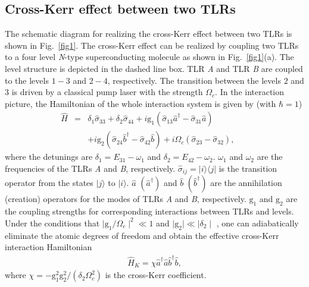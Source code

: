 \documentclass[showpacs,aps,graphicx,twocolumn]{revtex4}
\begin{document}
\subsection{Cross-Kerr effect between two TLRs}
\label{sec21}


The schematic diagram for realizing the cross-Kerr effect between
two TLRs is shown in Fig.~\ref{fig1}. The cross-Kerr effect can be
realized by coupling two TLRs to a four level \emph{N}-type
superconducting molecule as shown in Fig.~\ref{fig1}(a). The level
structure is depicted in the dashed line box. TLR \emph{A} and TLR
\emph{B} are coupled to the levels $1-3$ and $2-4$, respectively.
The transition between the levels $2$ and $3$ is driven by a
classical pump laser with the strength $\Omega_{c}$. In the interaction picture, the Hamiltonian
of the whole interaction system is given by \cite{YHu} (with
$\hbar=1$)
\begin{eqnarray}        \label{eq1}
\hat{H}&=&\delta_{1}\hat{\sigma}_{33}+\delta_{2}\hat{\sigma}_{44}
+i\text{g}_{1}\left(\hat{\sigma}_{13}\hat{a}^{\dag}-\hat{\sigma}_{31}\hat{a}\right)\nonumber\\
&&+i\text{g}_{2}\left(\hat{\sigma}_{24}\hat{b}^{\dag}-\hat{\sigma}_{42}\hat{b}\right)
+i\Omega_{c}\left(\hat{\sigma}_{23}-\hat{\sigma}_{32}\right),\;\;\;\;\;\;
\end{eqnarray}
where the detunings are $\delta_{1}=E_{31}-\omega_{1}$ and
$\delta_{2}=E_{42}-\omega_{2}$. $\omega_{1}$ and $\omega_{2}$ are
the frequencies of the TLRs \emph{A} and \emph{B}, respectively.
$\hat{\sigma}_{ij}=|i\rangle\langle j|$ is the transition operator
from the states $|j\rangle$ to $|i\rangle$. $\hat{a}$
$(\hat{a}^{\dag})$ and $\hat{b}$ $(\hat{b}^{\dag})$ are the
annihilation (creation) operators for the modes of TLRs \emph{A} and \emph{B}, respectively. $\text{g}_{1}$ and $\text{g}_{2}$ are the
coupling strengths for corresponding interactions between TLRs and
levels. Under the conditions that
$\mid\text{g}_{1}/\Omega_{c}\mid^{2}\ll 1$ and
$\mid\text{g}_{2}\mid\ll \mid\delta_{2}\mid$ \cite{AImamoglu1997},
one can adiabatically eliminate the atomic degrees of freedom and
obtain the effective cross-Kerr interaction Hamiltonian \cite{YHu}
\begin{eqnarray}        \label{eq2}
\hat{H}_{K}=\chi\hat{a}^{\dag}\hat{a}\hat{b}^{\dag}\hat{b},
\end{eqnarray}
where
$\chi=-\text{g}_{1}^{2}\text{g}_{2}^{2}/(\delta_{2}\Omega^{2}_{c})$
is the cross-Kerr coefficient.
\end{document}
